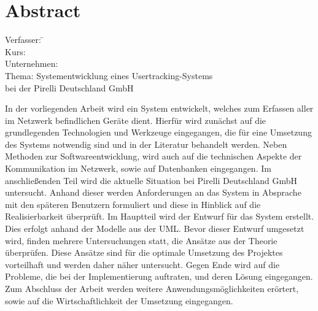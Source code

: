 \section*{Abstract}
\label{sec:Abstract}

\begin{tabbing}
Verfasser:	 \hspace{20mm} \= \autor\\
Kurs:	  \>\kursbez\\
Unternehmen:	  \>\firmenname\\
Thema:	  \> Systementwicklung eines Usertracking-Systems\\
		\> bei der Pirelli Deutschland GmbH\\
\end{tabbing}

In der vorliegenden Arbeit wird ein System entwickelt, welches zum Erfassen aller im Netzwerk befindlichen Geräte dient.
Hierfür wird zunächst auf die grundlegenden Technologien und Werkzeuge eingegangen, die für eine Umsetzung des Systems notwendig sind und in der Literatur behandelt werden.
Neben Methoden zur Softwareentwicklung, wird auch auf die technischen Aspekte der Kommunikation im Netzwerk, sowie auf Datenbanken eingegangen.
Im anschließenden Teil wird die aktuelle Situation bei Pirelli Deutschland GmbH untersucht. Anhand dieser werden Anforderungen an das System in Absprache mit den späteren Benutzern formuliert und diese in Hinblick auf die Realisierbarkeit überprüft.
Im Hauptteil wird der Entwurf für das System erstellt. Dies erfolgt anhand der Modelle aus der UML.
Bevor dieser Entwurf umgesetzt wird, finden mehrere Untersuchungen statt, die Ansätze aus der Theorie überprüfen. Diese Ansätze sind für die optimale Umsetzung des Projektes vorteilhaft und werden daher näher untersucht.
Gegen Ende wird auf die Probleme, die bei der Implementierung auftraten, und deren Lösung eingegangen. 
Zum Abschluss der Arbeit werden weitere Anwendungsmöglichkeiten erörtert, sowie auf die Wirtschaftlichkeit der Umsetzung eingegangen.